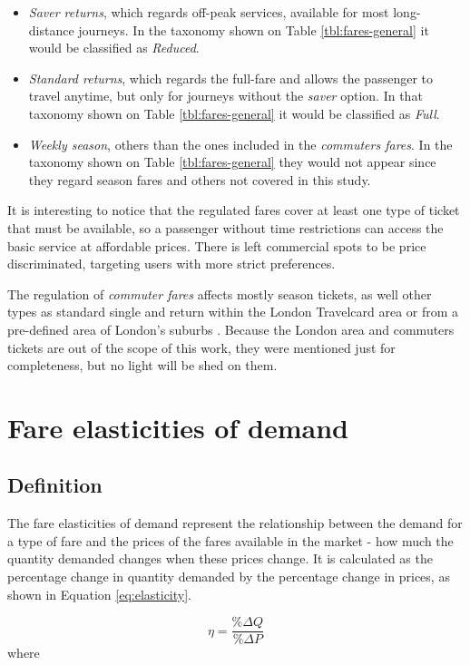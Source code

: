 \begin{itemize}  
\item \textit{Saver returns}, which regards off-peak services, available for most long-distance journeys. In the taxonomy shown on Table \ref{tbl:fares-general} it would be classified as \textit{Reduced}.
\item \textit{Standard returns}, which regards the full-fare and allows the passenger to travel anytime, but only for journeys without the \textit{saver} option. In that taxonomy shown on Table \ref{tbl:fares-general} it would be classified as \textit{Full}.
\item \textit{Weekly season}, others than the ones included in the \textit{commuters fares}. In the taxonomy shown on Table \ref{tbl:fares-general} they would not appear since they regard season fares and others not covered in this study.
\end{itemize}

It is interesting to notice that the regulated fares cover at least one type of ticket that must be available, so a passenger without time restrictions can access the basic service at affordable prices. There is left commercial spots to be price discriminated, targeting users with more strict preferences.

The regulation of \textit{commuter fares} affects mostly season tickets, as well other types as standard single and return within the London Travelcard area or from a pre-defined area of London's suburbs \citep{sra-conclusions}. Because the London area and commuters tickets are out of the scope of this work, they were mentioned just for completeness, but no light will be shed on them.

\section{Fare elasticities of demand}

\subsection{Definition}
The fare elasticities of demand represent the relationship between the demand for a type of fare and the prices of the fares available in the market -  how much the quantity demanded changes when these prices change. It is calculated as the percentage change in quantity demanded by the percentage change in prices, as shown in Equation \ref{eq:elasticity}.

\begin{equation}
\label{eq:elasticity}
\eta = \frac{\% \Delta Q }{\% \Delta P}
\end{equation}
where


